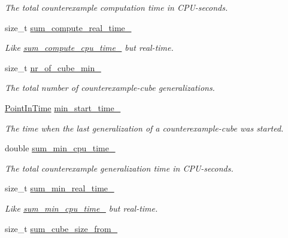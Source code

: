 \begin{DoxyCompactItemize}
\begin{DoxyCompactList}\small\item\em The total counterexample computation time in C\-P\-U-\/seconds. \end{DoxyCompactList}\item 
size\-\_\-t \hyperlink{classLearnStatisticsQBF_aceb8e32bfd42839f2c19d3b12e7eb888}{sum\-\_\-compute\-\_\-real\-\_\-time\-\_\-}
\begin{DoxyCompactList}\small\item\em Like \hyperlink{classLearnStatisticsQBF_a4caf75f422eed77570e5592ce35c9bd0}{sum\-\_\-compute\-\_\-cpu\-\_\-time\-\_\-} but real-\/time. \end{DoxyCompactList}\item 
size\-\_\-t \hyperlink{classLearnStatisticsQBF_aff417981063fbdf94164ce7b2d1e71a2}{nr\-\_\-of\-\_\-cube\-\_\-min\-\_\-}
\begin{DoxyCompactList}\small\item\em The total number of counterexample-\/cube generalizations. \end{DoxyCompactList}\item 
\hyperlink{Stopwatch_8h_af3a9f634f27bed7e98dbc23e5c6f807d}{Point\-In\-Time} \hyperlink{classLearnStatisticsQBF_a929ae751d1bbb728f96132e5ee6d99fa}{min\-\_\-start\-\_\-time\-\_\-}
\begin{DoxyCompactList}\small\item\em The time when the last generalization of a counterexample-\/cube was started. \end{DoxyCompactList}\item 
double \hyperlink{classLearnStatisticsQBF_a8fcce1bc5593631429c86bd3a1376e86}{sum\-\_\-min\-\_\-cpu\-\_\-time\-\_\-}
\begin{DoxyCompactList}\small\item\em The total counterexample generalization time in C\-P\-U-\/seconds. \end{DoxyCompactList}\item 
size\-\_\-t \hyperlink{classLearnStatisticsQBF_a6aded3992cd822a0ca45bc2d6658a5ab}{sum\-\_\-min\-\_\-real\-\_\-time\-\_\-}
\begin{DoxyCompactList}\small\item\em Like \hyperlink{classLearnStatisticsQBF_a8fcce1bc5593631429c86bd3a1376e86}{sum\-\_\-min\-\_\-cpu\-\_\-time\-\_\-} but real-\/time. \end{DoxyCompactList}\item 
size\-\_\-t \hyperlink{classLearnStatisticsQBF_a46277893a5465fb97805624e1ac31f38}{sum\-\_\-cube\-\_\-size\-\_\-from\-\_\-}

\end{DoxyCompactItemize}
